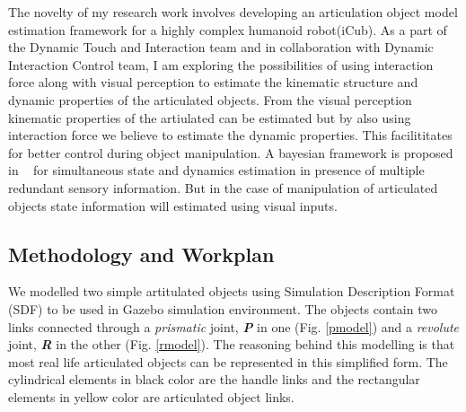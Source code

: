 \documentclass[12pt,a4paper]{report}
\begin{document}
The novelty of my research work involves developing an articulation object model estimation framework for a highly complex humanoid robot(iCub). As a part of the Dynamic Touch and Interaction team and in collaboration with Dynamic Interaction Control  team, I am  exploring the possibilities of using interaction force along with visual perception  to estimate the kinematic structure and dynamic properties of the articulated objects. From the visual perception kinematic properties of the artiulated can be estimated but by also using interaction force we believe to estimate the dynamic properties. This facilititates for better control during object manipulation. A bayesian framework is proposed in ~\cite{nori2015simultaneous} for simultaneous state and dynamics estimation in presence of multiple redundant sensory information. But in the case of manipulation of articulated objects state information will estimated using visual inputs. 


\subsection{Methodology and Workplan}

We modelled two simple artitulated objects using Simulation Description Format (SDF) to be used in Gazebo simulation environment. The objects contain two links connected through a \textit{prismatic} joint, \textit{\textbf{P}} in one (Fig. \ref{pmodel}) and a \textit{revolute} joint, \textit{\textbf{R}} in the other  (Fig. \ref{rmodel}). The reasoning behind this modelling is that most real life articulated objects can be represented in this simplified form. The cylindrical elements in black color are the handle links and the rectangular elements in yellow color are articulated object links.
\end{document}
